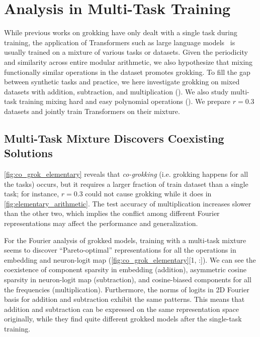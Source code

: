 \documentclass[10pt]{article} %
\begin{document}
\section{Analysis in Multi-Task Training}
While previous works on grokking have only dealt with a single task during training, the application of Transformers such as large language models~\citep{brown2020gpt3} is usually trained on a mixture of various tasks or datasets.
Given the periodicity and similarity across entire modular arithmetic, we also hypothesize that mixing functionally similar operations in the dataset promotes grokking.
To fill the gap between synthetic tasks and practice, we here investigate grokking on mixed datasets with addition, subtraction, and multiplication ().
We also study multi-task training mixing hard and easy polynomial operations ().
We prepare $r=0.3$ datasets and jointly train Transformers on their mixture.

\subsection{Multi-Task Mixture Discovers Coexisting Solutions}
\label{sec:multi_task_elem}
\autoref{fig:co_grok_elementary} reveals that \textit{co-grokking} (i.e. grokking happens for all the tasks) occurs, but it requires a larger fraction of train dataset than a single task; for instance, $r=0.3$ could not cause grokking while it does in \autoref{fig:elementary_arithmetic}.
The test accuracy of multiplication increases slower than the other two, which implies the conflict among different Fourier representations may affect the performance and generalization.

For the Fourier analysis of grokked models, training with a multi-task mixture seems to discover ``Pareto-optimal'' representations for all the operations in embedding and neuron-logit map (\autoref{fig:co_grok_elementary}[1, :]).
We can see the coexistence of component sparsity in embedding (addition), asymmetric cosine sparsity in neuron-logit map (subtraction), and cosine-biased components for all the frequencies (multiplication).
Furthermore, the norms of logits in 2D Fourier basis for addition and subtraction exhibit the same patterns. This means that addition and subtraction can be expressed on the same representation space originally, while they find quite different grokked models after the single-task training.
\end{document}
